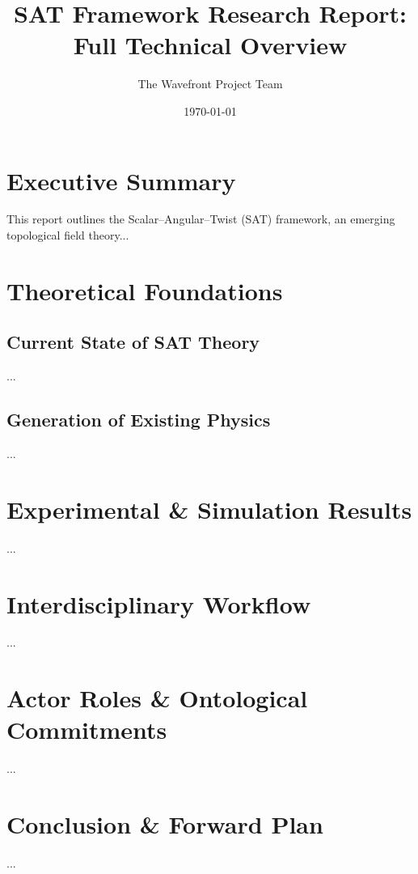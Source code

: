 \documentclass[twocolumn]{article}
\title{SAT Framework Research Report: Full Technical Overview}
\author{The Wavefront Project Team}
\date{\today}
\begin{document}
\maketitle

\tableofcontents
\newpage
\listoffigures
\newpage

\section{Executive Summary}
This report outlines the Scalar–Angular–Twist (SAT) framework, an emerging topological field theory...

\section{Theoretical Foundations}
\subsection{Current State of SAT Theory}
...

\subsection{Generation of Existing Physics}
...

\section{Experimental \& Simulation Results}
...

\section{Interdisciplinary Workflow}
...

\section{Actor Roles \& Ontological Commitments}
...

\section{Conclusion \& Forward Plan}
...

\printindex
\end{document}
